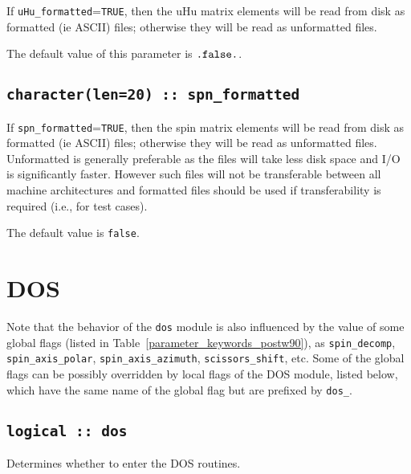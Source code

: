 If \verb#uHu_formatted#=\verb#TRUE#, then the uHu matrix elements will be
read from disk as formatted (ie ASCII) files; otherwise they will be
read as unformatted files.

The default value of this parameter is $\verb#.false.#$.




\subsection[spn\_formatted]{\tt character(len=20) :: spn\_formatted}

If \verb#spn_formatted#=\verb#TRUE#, then the spin matrix elements will be
read from disk as formatted (ie ASCII) files; otherwise they will be
read as unformatted files. Unformatted is generally preferable as the
files will take less disk space and I/O is significantly
faster. However such files will not be transferable between all
machine architectures and formatted files should be used if
transferability is required (i.e., for test cases).

The default value is \verb#false#.

\clearpage
\section{DOS}
Note that the behavior of the \verb#dos# module  is also influenced by
the value of some global flags (listed in
Table~\ref{parameter_keywords_postw90}), as
\verb#spin_decomp#, \verb#spin_axis_polar#, \verb#spin_axis_azimuth#,
\verb#scissors_shift#, etc.
Some of the global flags can be possibly
overridden by local flags of the DOS module, listed below, which have
the same name of the global flag but are prefixed by \verb#dos_#.

\subsection[dos]{\tt logical :: dos}
Determines whether to enter the DOS routines.

